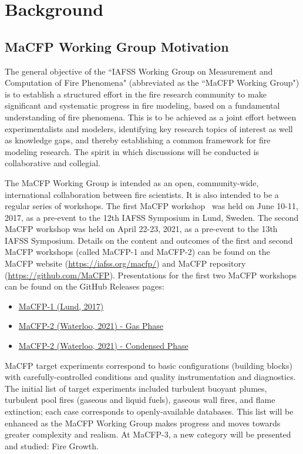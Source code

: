 \documentclass[12pt]{article}
\begin{document}
\pagestyle{empty}
\newpage
\section{Background}
\label{Sec:Background}
\subsection{MaCFP Working Group Motivation}
The general objective of the ``IAFSS Working Group on Measurement and Computation of Fire Phenomena" (abbreviated as the ``MaCFP Working Group") is to establish a structured effort in the fire research community to make significant and systematic progress in fire modeling, based on a fundamental understanding of fire phenomena. This is to be achieved as a joint effort between experimentalists and modelers, identifying key research topics of interest as well as knowledge gaps, and thereby establishing a common framework for fire modeling research. The spirit in which discussions will be conducted is collaborative and collegial.

The MaCFP Working Group is intended as an open, community-wide, international collaboration between fire scientists. It is also intended to be a regular series of workshops. The first MaCFP workshop~\cite{brown2018proceedings} was held on June 10-11, 2017, as a pre-event to the 12th IAFSS Symposium in Lund, Sweden. The second MaCFP workshop was held on April 22-23, 2021, as a pre-event to the 13th IAFSS Symposium. Details on the content and outcomes of the first and second MaCFP workshops (called MaCFP-1 and MaCFP-2) can be found on the MaCFP website (\url{https://iafss.org/macfp/}) and MaCFP repository (\url{https://github.com/MaCFP}). Presentations for the first two MaCFP workshops can be found on the GitHub Releases pages:
\begin{itemize}[noitemsep]
 \item \href{https://github.com/MaCFP/macfp-db/releases/tag/macfp-1.0}{MaCFP-1 (Lund, 2017)}
 \item \href{https://github.com/MaCFP/macfp-db/releases/tag/macfp-2.0}{MaCFP-2 (Waterloo, 2021) - Gas Phase}
 \item \href{https://github.com/MaCFP/matl-db/releases/tag/v1.1.0}{MaCFP-2 (Waterloo, 2021) - Condensed Phase}
\end{itemize}

MaCFP target experiments correspond to basic configurations (building blocks) with carefully-controlled conditions and quality instrumentation and diagnostics. The initial list of target experiments included turbulent buoyant plumes, turbulent pool fires (gaseous and liquid fuels), gaseous wall fires, and flame extinction; each case corresponds to openly-available databases. This list will be enhanced as the MaCFP Working Group makes progress and moves towards greater complexity and realism. At MaCFP-3, a new category will be presented and studied: Fire Growth.
\end{document}
